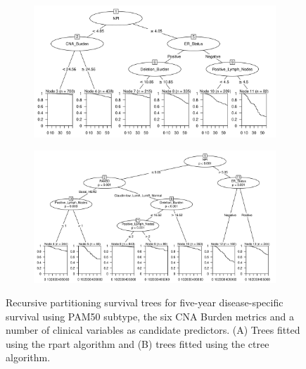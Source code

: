 \begin{figure}[!h]
\centering

\vspace{1cm}

\begin{subfigure}{\textwidth}
\subcaption{}
\includegraphics[width=1\textwidth]{../figures/Chapter_3/Clin_PartyKit_Survival_Burden_FiveYearDSS_PAM50.png}
\end{subfigure}

\vspace{3cm}

\begin{subfigure}{\textwidth}
\subcaption{}
\includegraphics[width=1\textwidth]{../figures/Chapter_3/Clin_Ctree_Survival_Burden_FiveYearDSS_PAM50.png}
\end{subfigure}

\vspace{1cm}

\caption[Recursive partitioning survival trees for five-year disease-specific survival using PAM50 subtype, the six CNA Burden metrics and a number of clinical variables as candidate predictors.]{Recursive partitioning survival trees for five-year disease-specific survival using PAM50 subtype, the six CNA Burden metrics and a number of clinical variables as candidate predictors. (A) Trees fitted using the rpart algorithm and (B) trees fitted using the ctree algorithm.}
\label{fig:PAM50_CNA_Burden_FiveYearDSS_Clin}
\end{figure}

